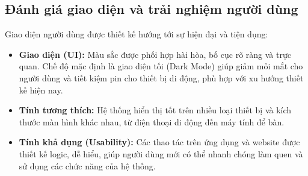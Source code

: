 \subsection{Đánh giá giao diện và trải nghiệm người dùng}
Giao diện người dùng được thiết kế hướng tới sự hiện đại và tiện dụng:

\begin{itemize}
    \item \textbf{Giao diện (UI):} Màu sắc được phối hợp hài hòa, bố cục rõ ràng và trực quan. Chế độ mặc định là giao diện tối (Dark Mode) giúp giảm mỏi mắt cho người dùng và tiết kiệm pin cho thiết bị di động, phù hợp với xu hướng thiết kế hiện nay.
    \item \textbf{Tính tương thích:} Hệ thống hiển thị tốt trên nhiều loại thiết bị và kích thước màn hình khác nhau, từ điện thoại di động đến máy tính để bàn.
    \item \textbf{Tính khả dụng (Usability):} Các thao tác trên ứng dụng và website được thiết kế logic, dễ hiểu, giúp người dùng mới có thể nhanh chóng làm quen và sử dụng các chức năng của hệ thống.
\end{itemize}
